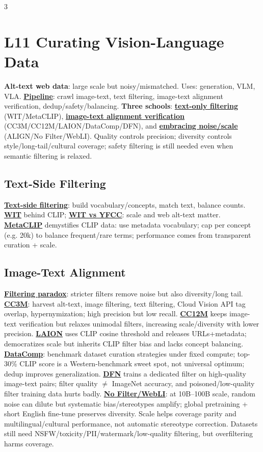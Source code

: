 \documentclass{article}
\numberwithin{equation}{subsection}
\newcommand{\key}[1]{\textbf{#1}}
\newcommand{\lowterm}[1]{\textbf{\underline{#1}}}
\begin{document}
\begin{multicols*}{3}
\section{L11 Curating Vision-Language Data}
\key{Alt-text web data}: large scale but noisy/mismatched. Uses: generation, VLM, VLA. \lowterm{Pipeline}: crawl image-text, text filtering, image-text alignment verification, dedup/safety/balancing.
\key{Three schools}: \lowterm{text-only filtering} (WIT/MetaCLIP), \lowterm{image-text alignment verification} (CC3M/CC12M/LAION/DataComp/DFN), and \lowterm{embracing noise/scale} (ALIGN/No Filter/WebLI). Quality controls precision; diversity controls style/long-tail/cultural coverage; safety filtering is still needed even when semantic filtering is relaxed.
\subsection{Text-Side Filtering}
\lowterm{Text-side filtering}: build vocabulary/concepts, match text, balance counts. \lowterm{WIT} behind CLIP; \lowterm{WIT vs YFCC}: scale and web alt-text matter. \lowterm{MetaCLIP} demystifies CLIP data: use metadata vocabulary; cap per concept (e.g. 20k) to balance frequent/rare terms; performance comes from transparent curation + scale.
\subsection{Image-Text Alignment}
\lowterm{Filtering paradox}: stricter filters remove noise but also diversity/long tail. \lowterm{CC3M}: harvest alt-text, image filtering, text filtering, Cloud Vision API tag overlap, hypernymization; high precision but low recall. \lowterm{CC12M} keeps image-text verification but relaxes unimodal filters, increasing scale/diversity with lower precision. \lowterm{LAION} uses CLIP cosine threshold and releases URLs+metadata; democratizes scale but inherits CLIP filter bias and lacks concept balancing. \lowterm{DataComp}: benchmark dataset curation strategies under fixed compute; top-30\% CLIP score is a Western-benchmark sweet spot, not universal optimum; dedup improves generalization. \lowterm{DFN} trains a dedicated filter on high-quality image-text pairs; filter quality $\ne$ ImageNet accuracy, and poisoned/low-quality filter training data hurts badly. \lowterm{No Filter/WebLI}: at 10B--100B scale, random noise can dilute but systematic bias/stereotypes amplify; global pretraining + short English fine-tune preserves diversity. Scale helps coverage parity and multilingual/cultural performance, not automatic stereotype correction. Datasets still need NSFW/toxicity/PII/watermark/low-quality filtering, but overfiltering harms coverage.


\end{multicols*}
\end{document}
